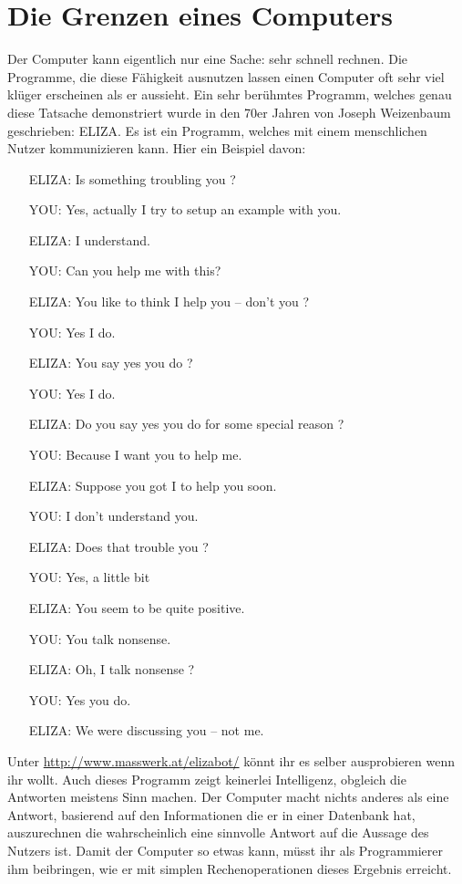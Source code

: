 \chapter{Die Grenzen eines Computers}

Der Computer kann eigentlich nur eine Sache: sehr schnell rechnen. Die Programme, die diese Fähigkeit ausnutzen lassen einen Computer oft sehr viel klüger erscheinen als er aussieht. Ein sehr berühmtes Programm, welches genau diese Tatsache demonstriert wurde in den 70er Jahren von Joseph Weizenbaum geschrieben: ELIZA. Es ist ein Programm, welches mit einem menschlichen Nutzer kommunizieren kann. Hier ein Beispiel davon:

\begin{itemize}
	\item[ELIZA:] Is something troubling you ?
	\item[YOU:] Yes, actually I try to setup an example with you.
	\item[ELIZA:] I understand.
	\item[YOU:] Can you help me with this?
	\item[ELIZA:] You like to think I help you -- don't you ?
	\item[YOU:] Yes I do.
	\item[ELIZA:] You say yes you do ?
	\item[YOU:] Yes I do.
	\item[ELIZA:] Do you say yes you do for some special reason ?
	\item[YOU:] Because I want you to help me.
	\item[ELIZA:] Suppose you got I to help you soon.
	\item[YOU:] I don't understand you.
	\item[ELIZA:] Does that trouble you ?
	\item[YOU:] Yes, a little bit
	\item[ELIZA:] You seem to be quite positive.
	\item[YOU:] You talk nonsense.
	\item[ELIZA:] Oh, I talk nonsense ?
	\item[YOU:] Yes you do.
	\item[ELIZA:] We were discussing you -- not me.
\end{itemize}

Unter \url{http://www.masswerk.at/elizabot/} könnt ihr es selber ausprobieren wenn ihr wollt. Auch dieses Programm zeigt keinerlei Intelligenz, obgleich die Antworten meistens Sinn machen. Der Computer macht nichts anderes als eine Antwort, basierend auf den Informationen die er in einer Datenbank hat, auszurechnen die wahrscheinlich eine sinnvolle Antwort auf die Aussage des Nutzers ist. Damit der Computer so etwas kann, müsst ihr als Programmierer ihm beibringen, wie er mit simplen Rechenoperationen dieses Ergebnis erreicht.

